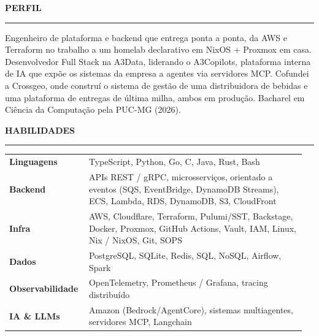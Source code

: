 \documentclass[10pt,a4paper]{article}
\newcommand{\colsection}[1]{%
  \par\vspace{1pt}%
  {\color{accent}\normalsize\bfseries\MakeUppercase{#1}}\par\nobreak
  \vspace{-3pt}\noindent\textcolor{accent}{\rule{\linewidth}{0.4pt}}\par\vspace{2pt}%
}
\begin{document}
\noindent
\begin{minipage}[t]{0.46\linewidth}
  \colsection{Perfil}
  Engenheiro de plataforma e backend que entrega ponta a ponta, da AWS e Terraform
  no trabalho a um homelab declarativo em NixOS + Proxmox em casa. Desenvolvedor
  Full Stack na A3Data, liderando o A3Copilots, plataforma interna de IA que
  expõe os sistemas da empresa a agentes via servidores MCP. Cofundei a Crossgeo,
  onde construí o sistema de gestão de uma distribuidora de bebidas e uma
  plataforma de entregas de última milha, ambos em produção. Bacharel em
  Ciência da Computação pela PUC-MG (2026).
\end{minipage}%
\hfill
\begin{minipage}[t]{0.52\linewidth}
  \colsection{Habilidades}
  \small
  \begin{tabular}{@{}p{0.25\linewidth}p{0.71\linewidth}@{}}
    \textbf{Linguagens} & TypeScript, Python, Go, C, Java, Rust, Bash \\
    \textbf{Backend} & APIs REST / gRPC, microsserviços, orientado a eventos
      (SQS, EventBridge, DynamoDB Streams), ECS, Lambda, RDS, DynamoDB, S3, CloudFront \\
    \textbf{Infra} & AWS, Cloudflare, Terraform, Pulumi/SST, Backstage,
      Docker, Proxmox, GitHub Actions, Vault, IAM, Linux, Nix / NixOS, Git, SOPS \\
    \textbf{Dados} & PostgreSQL, SQLite, Redis, SQL, NoSQL, Airflow, Spark \\
    \textbf{Observabilidade} & OpenTelemetry, Prometheus / Grafana, tracing distribuído \\
    \textbf{IA \& LLMs} & Amazon (Bedrock/AgentCore), sistemas multiagentes, servidores MCP, Langchain \\
  \end{tabular}
\end{minipage}
\end{document}

